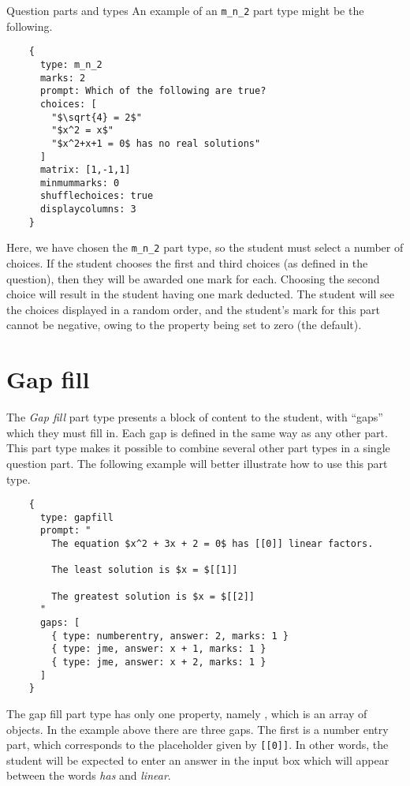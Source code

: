 \begin{chapter}{\label{cha:question_parts}Question parts and types}
  An example of an \verb"m_n_2" part type might be the following.
  \begin{Verbatim}
    {
      type: m_n_2
      marks: 2
      prompt: Which of the following are true?
      choices: [
        "$\sqrt{4} = 2$"
        "$x^2 = x$"
        "$x^2+x+1 = 0$ has no real solutions"
      ]
      matrix: [1,-1,1]
      minmummarks: 0
      shufflechoices: true
      displaycolumns: 3
    }
  \end{Verbatim}
  Here, we have chosen the \verb"m_n_2" part type, so the student must select a
  number of choices.  If the student chooses the first and third choices (as
  defined in the question), then they will be awarded one mark for each.
  Choosing the second choice will result in the student having one mark
  deducted.  The student will see the choices displayed in a random order, and
  the student's mark for this part cannot be negative, owing to the
   property being set to zero (the default).

  \section{\label{sec:gapfill_part}Gap fill}
  The \emph{Gap fill} part type presents a block of content to the student,
  with ``gaps'' which they must fill in.  Each gap is defined in the same way
  as any other part.  This part type makes it possible to combine several other
  part types in a single question part.  The following example will better
  illustrate how to use this part type.
  \begin{Verbatim}
    {
      type: gapfill
      prompt: "
        The equation $x^2 + 3x + 2 = 0$ has [[0]] linear factors.

        The least solution is $x = $[[1]]

        The greatest solution is $x = $[[2]]
      "
      gaps: [
        { type: numberentry, answer: 2, marks: 1 }
        { type: jme, answer: x + 1, marks: 1 }
        { type: jme, answer: x + 2, marks: 1 }
      ]
    }
  \end{Verbatim}
  The gap fill part type has only one property, namely , which
  is an array of  objects.  In the example above there are
  three gaps.  The first is a number entry part, which corresponds to the
  placeholder given by \verb"[[0]]".  In other words, the student will be
  expected to enter an answer in the input box which will appear between the
  words \emph{has} and \emph{linear}.


\end{chapter}
